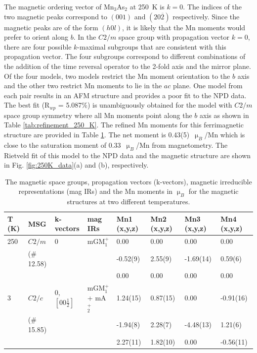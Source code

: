 \documentclass[letterpaper,10pt,doublespacing,edeposit]{uiucthesis2020}
\begin{document}
\begin{mainmatter}
The magnetic ordering vector of Mn$_3$As$_2$ at 250~K is $k = 0$. The indices of the two magnetic peaks correspond to $(001)$ and $(20\overline{2})$ respectively. Since the magnetic peaks are of the form $(h0l)$, it is likely that the Mn moments would prefer to orient along $b$. In the $C2/m$ space group with propagation vector $k=0$, there are four possible $k$-maximal subgroups that are consistent with this propagation vector. The four subgroups correspond to different combinations of the addition of the time reversal operator to the 2-fold axis and the mirror plane. 
Of the four models, two models restrict the Mn moment orientation to the $b$ axis and the other two restrict Mn moments to lie in the $ac$ plane. 
One model from each pair results in an AFM structure and provides a poor fit to the NPD data. 
The best fit (R$_{wp}$ = 5.087\%) is unambiguously obtained for the model with $C2/m$ space group symmetry where all Mn moments point along the $b$ axis as shown in Table \ref{tab:refinement_250_K}.
The refined Mn moments for this ferrimagnetic structure are provided in Table \ref{tab:Mn_moments}. The net moment is 0.43(5)~$\upmu_B$/Mn which is close to the saturation moment of 0.33~$\upmu_B$/Mn from magnetometry. The Rietveld fit of this model to the NPD data and the magnetic structure are shown in Fig. \ref{fig:250K_data}(a) and (b), respectively. 


\begin{table}
\caption{\label{tab:Mn_moments} 
The magnetic space groups, propagation vectors (k-vectors), magnetic irreducible representations (mag IRs) and the Mn moments in $\upmu_B$ for the magnetic structures at two different temperatures.
}
\centering
\begin{tabular}{p{1.5cm}p{2cm}p{2.2cm}p{2.6cm}p{2.15cm}p{2.15cm}p{2.15cm}p{2.15cm}}
\hline\hline
\textbf{T (K)} & \textbf{MSG} & \textbf{k-vectors} & \textbf{mag IRs} & \textbf{Mn1 (x,y,z)} & \textbf{Mn2 (x,y,z)} & \textbf{Mn3 (x,y,z)} & \textbf{Mn4 (x,y,z)}\\
\hline\hline
250 & $C2/m$ & 0 & mGM$_1^+$ & 0.00 & 0.00 & 0.00 & 0.00\\
& ($\#$12.58) & & & -0.52(9) & 2.55(9) & -1.69(14) & 0.59(6)\\
& & & & 0.00 & 0.00 & 0.00 & 0.00\\
\hline
3 & $C2/c$ & 0, $[00\frac{1}{2}]$ & mGM$_1^+$ + mA$_2^+$ & 1.24(15) & 0.87(15) & 0.00 & -0.91(16)\\
& ($\#$15.85) & & & -1.94(8) & 2.28(7) & -4.48(13) & 1.21(6)\\
& & & & 2.27(11) & 1.82(10) & 0.00 & -0.56(11)\\
\hline\hline
\end{tabular}
~\\
\end{table}


\end{mainmatter}
\end{document}
